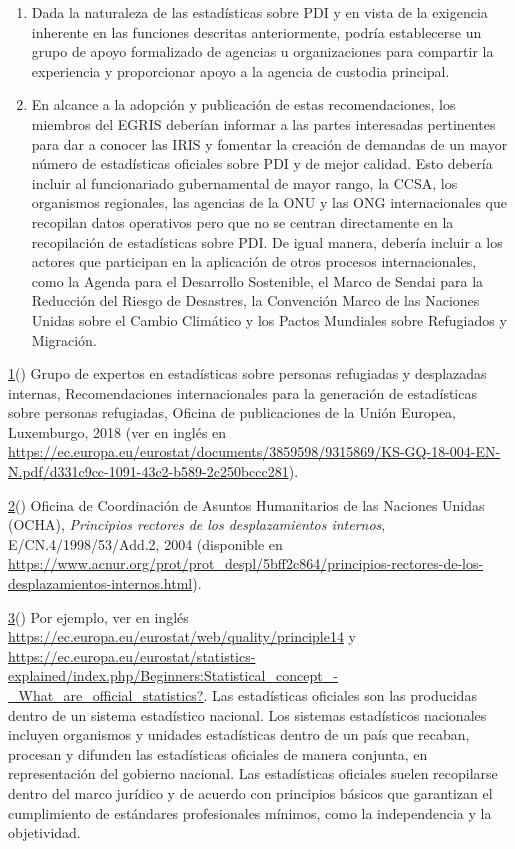 \documentclass[
]{book}
\providecommand{\tightlist}{%
  \setlength{\itemsep}{0pt}\setlength{\parskip}{0pt}}
\begin{document}
\begin{enumerate}
\def\labelenumi{\arabic{enumi}.}
\tightlist
\item
  Dada la naturaleza de las estadísticas sobre PDI y en vista de la exigencia inherente en las funciones descritas anteriormente, podría establecerse un grupo de apoyo formalizado de agencias u organizaciones para compartir la experiencia y proporcionar apoyo a la agencia de custodia principal.
\item
  En alcance a la adopción y publicación de estas recomendaciones, los miembros del EGRIS deberían informar a las partes interesadas pertinentes para dar a conocer las IRIS y fomentar la creación de demandas de un mayor número de estadísticas oficiales sobre PDI y de mejor calidad. Esto debería incluir al funcionariado gubernamental de mayor rango, la CCSA, los organismos regionales, las agencias de la ONU y las ONG internacionales que recopilan datos operativos pero que no se centran directamente en la recopilación de estadísticas sobre PDI. De igual manera, debería incluir a los actores que participan en la aplicación de otros procesos internacionales, como la Agenda para el Desarrollo Sostenible, el Marco de Sendai para la Reducción del Riesgo de Desastres, la Convención Marco de las Naciones Unidas sobre el Cambio Climático y los Pactos Mundiales sobre Refugiados y Migración.
\end{enumerate}

\protect\hyperlink{sdfootnote1anc}{1}() Grupo de expertos en estadísticas sobre personas refugiadas y desplazadas internas, Recomendaciones internacionales para la generación de estadísticas sobre personas refugiadas, Oficina de publicaciones de la Unión Europea, Luxemburgo, 2018 (ver en inglés en \url{https://ec.europa.eu/eurostat/documents/3859598/9315869/KS-GQ-18-004-EN-N.pdf/d331c9cc-1091-43c2-b589-2c250bccc281}).

\protect\hyperlink{sdfootnote2anc}{2}() Oficina de Coordinación de Asuntos Humanitarios de las Naciones Unidas (OCHA), \emph{Principios rectores de los desplazamientos internos}, E/CN.4/1998/53/Add.2, 2004 (disponible en \url{https://www.acnur.org/prot/prot_despl/5bff2c864/principios-rectores-de-los-desplazamientos-internos.html}).

\protect\hyperlink{sdfootnote3anc}{3}() Por ejemplo, ver en inglés \url{https://ec.europa.eu/eurostat/web/quality/principle14} y \url{https://ec.europa.eu/eurostat/statistics-explained/index.php/Beginners:Statistical_concept_-_What_are_official_statistics?}. Las estadísticas oficiales son las producidas dentro de un sistema estadístico nacional. Los sistemas estadísticos nacionales incluyen organismos y unidades estadísticas dentro de un país que recaban, procesan y difunden las estadísticas oficiales de manera conjunta, en representación del gobierno nacional. Las estadísticas oficiales suelen recopilarse dentro del marco jurídico y de acuerdo con principios básicos que garantizan el cumplimiento de estándares profesionales mínimos, como la independencia y la objetividad.
\end{document}
